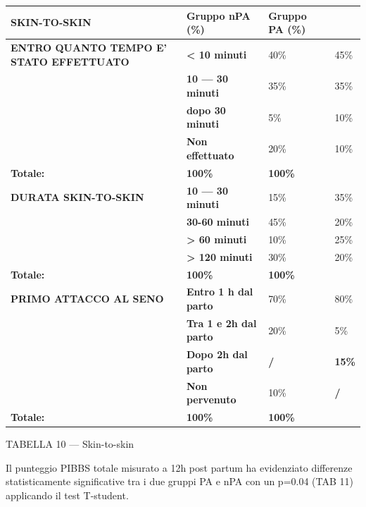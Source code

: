 \documentclass[]{article}
\begin{document}
\begin{longtable}[]{@{}llll@{}}
\toprule
\textbf{SKIN-TO-SKIN} & \textbf{Gruppo nPA (\%)} & \textbf{Gruppo PA
(\%)} &\tabularnewline
\midrule
\endhead
\textbf{ENTRO QUANTO TEMPO E' STATO EFFETTUATO} & \textbf{\textless{} 10
minuti} & 40\% & 45\%\tabularnewline
& \textbf{10 --- 30 minuti} & 35\% & 35\%\tabularnewline
& \textbf{dopo 30 minuti} & 5\% & 10\%\tabularnewline
& \textbf{Non effettuato} & 20\% & 10\%\tabularnewline
\textbf{Totale:} & \textbf{100\%} & \textbf{100\%} &\tabularnewline
\textbf{DURATA SKIN-TO-SKIN} & \textbf{10 --- 30 minuti} & 15\% &
35\%\tabularnewline
& \textbf{30-60 minuti} & 45\% & 20\%\tabularnewline
& \textbf{\textgreater{} 60 minuti} & 10\% & 25\%\tabularnewline
& \textbf{\textgreater{} 120 minuti} & 30\% & 20\%\tabularnewline
\textbf{Totale:} & \textbf{100\%} & \textbf{100\%} &\tabularnewline
\textbf{PRIMO ATTACCO AL SENO} & \textbf{Entro 1 h dal parto} & 70\% &
80\%\tabularnewline
& \textbf{Tra 1 e 2h dal parto} & 20\% & 5\%\tabularnewline
& \textbf{Dopo 2h dal parto} & \textbf{/} & \textbf{15\%}\tabularnewline
& \textbf{Non pervenuto} & 10\% & \textbf{/}\tabularnewline
\textbf{Totale:} & \textbf{100\%} & \textbf{100\%} &\tabularnewline
\bottomrule
\end{longtable}

TABELLA 10 --- Skin-to-skin

Il punteggio PIBBS totale misurato a 12h post partum ha evidenziato
differenze statisticamente significative tra i due gruppi PA e nPA con
un p=0.04 (TAB 11) applicando il test T-student.
\end{document}
